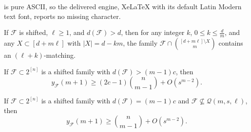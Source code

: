 \documentclass[10pt,a4paper]{amsart}
\begin{document}
is pure ASCII, so the delivered engine, XeLaTeX with its default Latin Modern text font, reports no missing character.
\begin{lemma} \label{l.deleteon_with_shifting}
    If $\mathcal{F}$ is shifted, $\ell \geq 1$, and $d(\mathcal{F}) > d$, then for any integer $k$, $0 \leq k \leq \frac{d}{m}$, and any $X \subset [d + m\ell]$ with $|X| = d - km$, the family $\mathcal{F} \cap {[d+m\ell] \setminus X \choose m}$ contains an $(\ell+k)$-matching.
\end{lemma}

\begin{lemma} \label{l.d_geq_mc-c+1}
    If $\mathcal{F} \subset 2^{[n]}$ is a shifted family with $d(\mathcal{F}) > (m-1)c$, then
    \[
    y_{\mathcal{F}}(m+1) \geq (2c-1){n \choose m - 1} + O(s^{m - 2}).
    \]
\end{lemma}

\begin{lemma} \label{l.stability_d_eq_mc-c}
    If $\mathcal{F} \subset 2^{[n]}$ is a shifted family with $d(\mathcal{F}) = (m-1)c$ and $\mathcal{F} \nsubseteq \mathcal{Q}(m,s,\ell)$, then
    \[
    y_{\mathcal{F}}(m+1) \geq {n \choose m - 1} + O(s^{m-2}).
    \]
\end{lemma}
\end{document}
